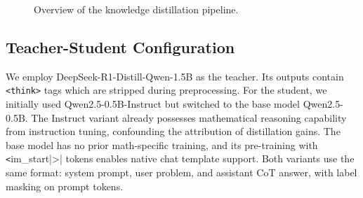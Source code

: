 \documentclass{article}
\begin{document}
\begin{figure}[H]
    \centering
    \caption{Overview of the knowledge distillation pipeline.}
    \label{fig:pipeline}
\end{figure}

\subsection{Teacher-Student Configuration}

We employ DeepSeek-R1-Distill-Qwen-1.5B as the teacher. Its outputs contain \verb|<think>| tags which are stripped during preprocessing. For the student, we initially used Qwen2.5-0.5B-Instruct but switched to the base model Qwen2.5-0.5B. The Instruct variant already possesses mathematical reasoning capability from instruction tuning, confounding the attribution of distillation gains. The base model has no prior math-specific training, and its pre-training with \verb|<|im\_start|>| tokens enables native chat template support. Both variants use the same format: system prompt, user problem, and assistant CoT answer, with label masking on prompt tokens.
\end{document}
